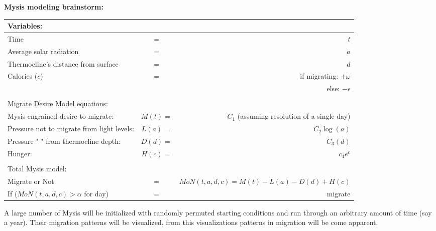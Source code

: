 \documentclass[]{article}
\begin{document}
 
\centerline{{\Large \textbf{Mysis modeling brainstorm:}}}
\vspace{3em}

\begin{adjustbox}{center}
\begin{tabular}{lcr}
{\large Variables:} & & \\\hline\hline
Time& = & $t$\\\hline
Average solar radiation & = & $a$ \\\hline
Thermocline's distance from surface& = &$d$ \\\hline
Calories ($c$) & = &  if migrating: $ +\omega$ \\\hline
& & else: $ - \epsilon $ \\

&&\\
{\large Migrate Desire Model equations:} & & \\\hline \hline
Mysis engrained desire to migrate:        & $M(t) = $ & $C_1$ (assuming resolution of a single day)\\\hline
Pressure not to migrate from light levels: & $L(a) = $ & $C_2\log(a)$\\\hline
Pressure "                                                  " from thermocline depth:& $D(d) = $&$C_3(d)$\\\hline
Hunger: & $H(c) = $&$c_4e^c$\\ \hline
&&\\

{\large Total Mysis model:} & & \\\hline\hline
Migrate or Not & = & $MoN(t,a,d,c)= M(t) - L(a) - D(d) + H(c)$\\\hline
If ($MoN(t,a,d,c)> \alpha$ for day) & = & migrate\\\hline
\end{tabular}
\end{adjustbox}
\vspace{3em}

A large number of Mysis will be initialized with randomly permuted starting conditions and run through an arbitrary amount of time (say a year). Their migration patterns will be visualized, from this visualizations patterns in migration will be come apparent. 
\end{document}
